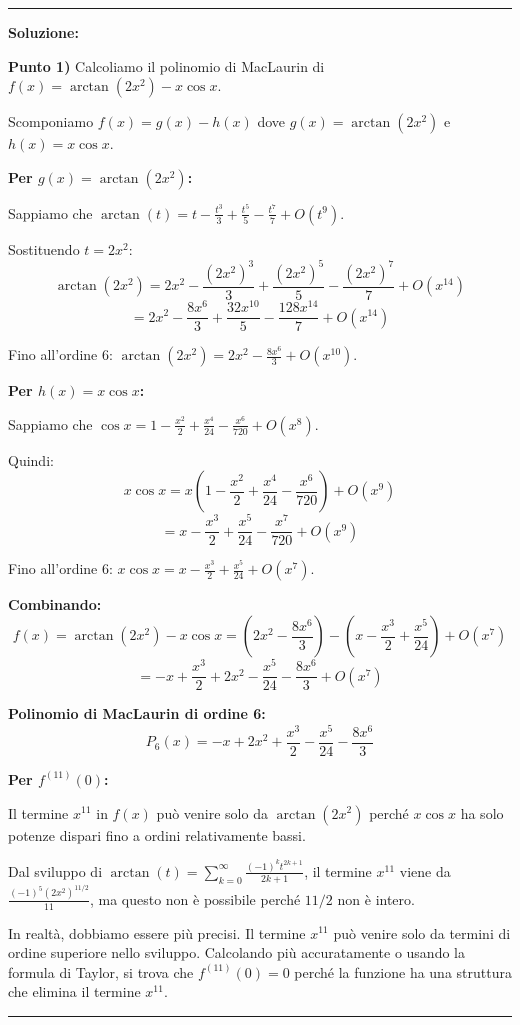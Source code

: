 \documentclass[12pt, a4paper]{article}
\newenvironment{solution}
{\par\noindent\rule{\textwidth}{0.4pt}\par\textbf{Soluzione:}\medskip\par}
{\par\rule{\textwidth}{0.4pt}\par\bigskip}
\begin{document}
\begin{solution}
\textbf{Punto 1)} Calcoliamo il polinomio di MacLaurin di $f(x) = \arctan(2x^{2}) - x \cos x$.

Scomponiamo $f(x) = g(x) - h(x)$ dove $g(x) = \arctan(2x^2)$ e $h(x) = x\cos x$.

\textbf{Per $g(x) = \arctan(2x^2)$:}

Sappiamo che $\arctan(t) = t - \frac{t^3}{3} + \frac{t^5}{5} - \frac{t^7}{7} + O(t^9)$.

Sostituendo $t = 2x^2$:
\[
\arctan(2x^2) = 2x^2 - \frac{(2x^2)^3}{3} + \frac{(2x^2)^5}{5} - \frac{(2x^2)^7}{7} + O(x^{14})
\]
\[
= 2x^2 - \frac{8x^6}{3} + \frac{32x^{10}}{5} - \frac{128x^{14}}{7} + O(x^{14})
\]

Fino all'ordine 6: $\arctan(2x^2) = 2x^2 - \frac{8x^6}{3} + O(x^{10})$.

\textbf{Per $h(x) = x\cos x$:}

Sappiamo che $\cos x = 1 - \frac{x^2}{2} + \frac{x^4}{24} - \frac{x^6}{720} + O(x^8)$.

Quindi:
\[
x\cos x = x\left(1 - \frac{x^2}{2} + \frac{x^4}{24} - \frac{x^6}{720}\right) + O(x^9)
\]
\[
= x - \frac{x^3}{2} + \frac{x^5}{24} - \frac{x^7}{720} + O(x^9)
\]

Fino all'ordine 6: $x\cos x = x - \frac{x^3}{2} + \frac{x^5}{24} + O(x^7)$.

\textbf{Combinando:}
\[
f(x) = \arctan(2x^2) - x\cos x = \left(2x^2 - \frac{8x^6}{3}\right) - \left(x - \frac{x^3}{2} + \frac{x^5}{24}\right) + O(x^7)
\]
\[
= -x + \frac{x^3}{2} + 2x^2 - \frac{x^5}{24} - \frac{8x^6}{3} + O(x^7)
\]

\textbf{Polinomio di MacLaurin di ordine 6:}
\[
P_6(x) = -x + 2x^2 + \frac{x^3}{2} - \frac{x^5}{24} - \frac{8x^6}{3}
\]

\textbf{Per $f^{(11)}(0)$:}

Il termine $x^{11}$ in $f(x)$ può venire solo da $\arctan(2x^2)$ perché $x\cos x$ ha solo potenze dispari fino a ordini relativamente bassi.

Dal sviluppo di $\arctan(t) = \sum_{k=0}^{\infty} \frac{(-1)^k t^{2k+1}}{2k+1}$, il termine $x^{11}$ viene da $\frac{(-1)^5 (2x^2)^{11/2}}{11}$, ma questo non è possibile perché $11/2$ non è intero.

In realtà, dobbiamo essere più precisi. Il termine $x^{11}$ può venire solo da termini di ordine superiore nello sviluppo. Calcolando più accuratamente o usando la formula di Taylor, si trova che $f^{(11)}(0) = 0$ perché la funzione ha una struttura che elimina il termine $x^{11}$.


\end{solution}
\end{document}
